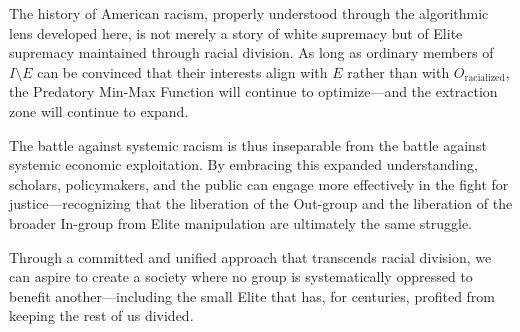 \documentclass[12pt,openany]{book}
\begin{document}
The history of American racism, properly understood through the algorithmic lens developed here, is not merely a story of white supremacy but of Elite supremacy maintained through racial division. As long as ordinary members of $I \setminus E$ can be convinced that their interests align with $E$ rather than with $O_{\text{racialized}}$, the Predatory Min-Max Function will continue to optimize---and the extraction zone will continue to expand.

The battle against systemic racism is thus inseparable from the battle against systemic economic exploitation. By embracing this expanded understanding, scholars, policymakers, and the public can engage more effectively in the fight for justice---recognizing that the liberation of the Out-group and the liberation of the broader In-group from Elite manipulation are ultimately the same struggle.

Through a committed and unified approach that transcends racial division, we can aspire to create a society where no group is systematically oppressed to benefit another---including the small Elite that has, for centuries, profited from keeping the rest of us divided.

\backmatter
\end{document}
